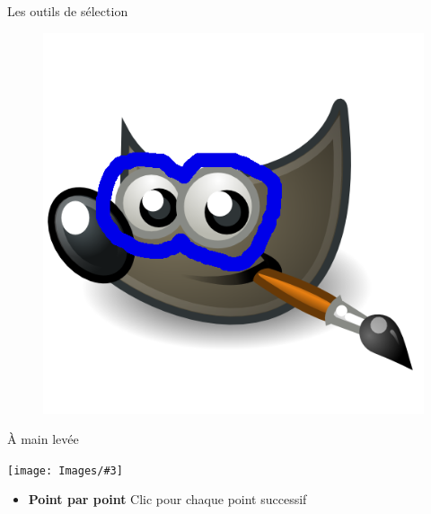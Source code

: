 \documentclass[10pt,svgnames,usenames,table]{beamer}
\newcommand{\tool}[3]{%
	\begin{minipage}{0.40\textwidth}
	\item #1	
	\end{minipage}\hfill
	\begin{minipage}{0.20\textwidth}
	\begin{flushright}
	\keys{#2}
	\end{flushright}
	\end{minipage}
	\begin{minipage}{0.06\textwidth}
	\fbox{ou}
	\end{minipage}
	\begin{minipage}{0.1\textwidth}
	\texttt{[image: Images/\#3]}
	\end{minipage}
}
\begin{document}
\begin{frame}[allowframebreaks]{Les outils de sélection}
\begin{enumerate}
\begin{minipage}{0.45\textwidth}
\begin{figure}
        		\includegraphics[width=\textwidth]{Images/main_levee.png} 
		\end{figure}
		\end{minipage}
		
	\framebreak
	
	\setcounter{enumi}{3}
	\tool{À main levée}{F}{freeSelect.png}

	\begin{itemize}
		\item \textbf{Point par point} Clic pour chaque point successif 
	\end{itemize}
	

\end{enumerate}
\end{frame}
\end{document}

